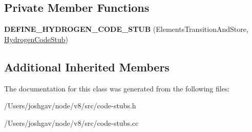 \subsection*{Private Member Functions}
\begin{DoxyCompactItemize}
\item 
{\bfseries D\+E\+F\+I\+N\+E\+\_\+\+H\+Y\+D\+R\+O\+G\+E\+N\+\_\+\+C\+O\+D\+E\+\_\+\+S\+T\+UB} (Elements\+Transition\+And\+Store, \hyperlink{classv8_1_1internal_1_1_hydrogen_code_stub}{Hydrogen\+Code\+Stub})\hypertarget{classv8_1_1internal_1_1_elements_transition_and_store_stub_a1b787d4eacdae250d7542a68b0c7bad9}{}\label{classv8_1_1internal_1_1_elements_transition_and_store_stub_a1b787d4eacdae250d7542a68b0c7bad9}

\end{DoxyCompactItemize}
\subsection*{Additional Inherited Members}


The documentation for this class was generated from the following files\+:\begin{DoxyCompactItemize}
\item 
/\+Users/joshgav/node/v8/src/code-\/stubs.\+h\item 
/\+Users/joshgav/node/v8/src/code-\/stubs.\+cc\end{DoxyCompactItemize}
